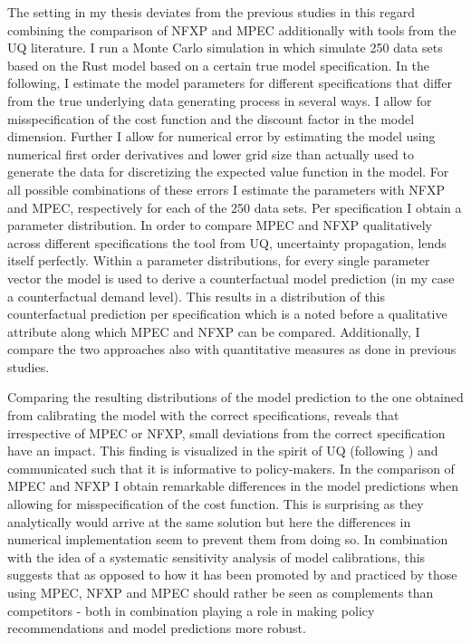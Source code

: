 The setting in my thesis deviates from the previous studies in this regard combining the comparison of NFXP and MPEC additionally with tools from the UQ literature. I run a Monte Carlo simulation in which simulate 250 data sets based on the Rust model based on a certain true model specification. In the following, I estimate the model parameters for different specifications that differ from the true underlying data generating process in several ways. I allow for misspecification of the cost function and the discount factor in the model dimension. Further I allow for numerical error by estimating the model using numerical first order derivatives and lower grid size than actually used to generate the data for discretizing the expected value function in the model. For all possible combinations of these errors I estimate the parameters with NFXP and MPEC, respectively for each of the 250 data sets. Per specification I obtain a parameter distribution. In order to compare MPEC and NFXP qualitatively across different specifications the tool from UQ, uncertainty propagation, lends itself perfectly. Within a parameter distributions, for every single parameter vector the model is used to derive a counterfactual model prediction (in my case a counterfactual demand level). This results in a distribution of this counterfactual prediction per specification which is a noted before a qualitative attribute along which MPEC and NFXP can be compared. Additionally, I compare the two approaches also with quantitative measures as done in previous studies.

Comparing the resulting distributions of the model prediction to the one obtained from calibrating the model with the correct specifications, reveals that irrespective of MPEC or NFXP, small deviations from the correct specification have an impact. This finding is visualized in the spirit of UQ (following \cite{Oberkampf.2010}) and communicated such that it is informative to policy-makers. In the comparison of MPEC and NFXP I obtain remarkable differences in the model predictions when allowing for misspecification of the cost function. This is surprising as they analytically would arrive at the same solution but here the differences in numerical implementation seem to prevent them from doing so. In combination with the idea of a systematic sensitivity analysis of model calibrations, this suggests that as opposed to how it has been promoted by \cite{Su.Judd.2012} and practiced by those using MPEC, NFXP and MPEC should rather be seen as complements than competitors - both in combination playing a role in making policy recommendations and model predictions more robust.


